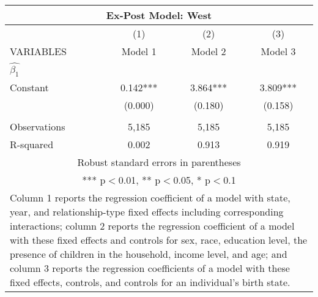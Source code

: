 \begin{tabular}{lccc}
\multicolumn{4}{c}{Ex-Post Model: West} \\ \hline
 & (1) & (2) & (3) \\
VARIABLES & Model 1 & Model 2 & Model 3 \\ \hline
 $\hat{\beta_1}$ &  &  &  \\
Constant & 0.142*** & 3.864*** & 3.809*** \\
 & (0.000) & (0.180) & (0.158) \\
 &  &  &  \\
Observations & 5,185 & 5,185 & 5,185 \\
 R-squared & 0.002 & 0.913 & 0.919 \\ \hline
\multicolumn{4}{c}{ Robust standard errors in parentheses} \\
\multicolumn{4}{c}{ *** p$<$0.01, ** p$<$0.05, * p$<$0.1} \\
\multicolumn{4}{p{0.8\linewidth}}{\small Column 1 reports the regression coefficient of a model with state, year, and relationship-type fixed effects including corresponding interactions; column 2 reports the regression coefficient of a model with these fixed effects and controls for sex, race, education level, the presence of children in the household, income level, and age; and column 3 reports the regression coefficients of a model with these fixed effects, controls, and controls for an individual’s birth state.} \\
\end{tabular}
